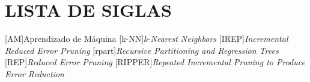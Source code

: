 \thispagestyle{empty}

\chapter*{\normalsize{\textbf{LISTA DE SIGLAS}}}

\begin{acronym}[]
    [AM]{Aprendizado de Máquina}
    [k-NN]{\textit{k-Nearest Neighbors}}
    [IREP]{\textit{Incremental Reduced Error Pruning}}
    [rpart]{\textit{Recursive Partitioning and Regression Trees}}
    [REP]{\textit{Reduced Error Pruning}}
    [RIPPER]{\textit{Repeated Incremental Pruning to Produce Error Reduction}}
\end{acronym}

\newpage